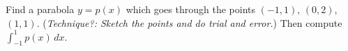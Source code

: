 Find a parabola $y=p(x)$ which goes through the points $(-1,1)$, $(0,2)$, $(1,1)$.  (\emph{Technique?: Sketch the points and do trial and error.})  Then compute $\displaystyle \int_{-1}^1 p(x)\,dx$.
